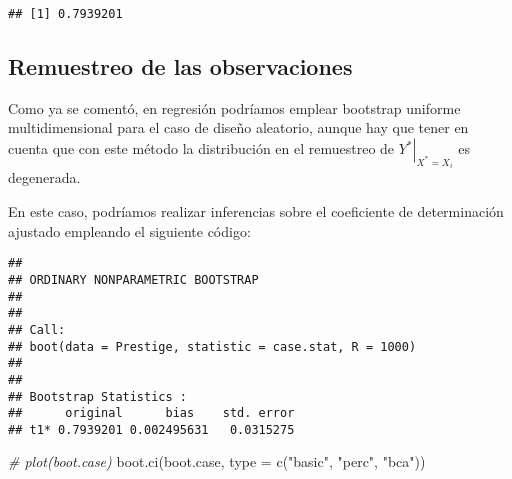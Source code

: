 \documentclass[
]{book}
\newenvironment{Shaded}{\begin{snugshade}}{\end{snugshade}}
\newcommand{\AttributeTok}[1]{\textcolor[rgb]{0.77,0.63,0.00}{#1}}
\newcommand{\CommentTok}[1]{\textcolor[rgb]{0.56,0.35,0.01}{\textit{#1}}}
\newcommand{\ControlFlowTok}[1]{\textcolor[rgb]{0.13,0.29,0.53}{\textbf{#1}}}
\newcommand{\DecValTok}[1]{\textcolor[rgb]{0.00,0.00,0.81}{#1}}
\newcommand{\FunctionTok}[1]{\textcolor[rgb]{0.00,0.00,0.00}{#1}}
\newcommand{\NormalTok}[1]{#1}
\newcommand{\OtherTok}[1]{\textcolor[rgb]{0.56,0.35,0.01}{#1}}
\newcommand{\SpecialCharTok}[1]{\textcolor[rgb]{0.00,0.00,0.00}{#1}}
\newcommand{\StringTok}[1]{\textcolor[rgb]{0.31,0.60,0.02}{#1}}
\theoremstyle{break}
\theoremstyle{definition}
\theoremstyle{definition}
\theoremstyle{definition}
\theoremstyle{definition}
\theoremstyle{remark}
\begin{document}
\begin{verbatim}
## [1] 0.7939201
\end{verbatim}

\hypertarget{boot-unif-reg}{%
\subsection{Remuestreo de las observaciones}\label{boot-unif-reg}}

Como ya se comentó, en regresión podríamos emplear bootstrap uniforme multidimensional para el caso de diseño aleatorio, aunque hay que tener en cuenta que con este método la distribución en el remuestreo de \(\left. Y^{\ast}\right\vert _{X^{\ast}=X_i}\) es degenerada.

En este caso, podríamos realizar inferencias sobre el coeficiente de determinación ajustado empleando el siguiente código:

\begin{Shaded}
\end{Shaded}

\begin{verbatim}
## 
## ORDINARY NONPARAMETRIC BOOTSTRAP
## 
## 
## Call:
## boot(data = Prestige, statistic = case.stat, R = 1000)
## 
## 
## Bootstrap Statistics :
##      original      bias    std. error
## t1* 0.7939201 0.002495631   0.0315275
\end{verbatim}

\begin{Shaded}
\begin{Highlighting}[]
\CommentTok{\# plot(boot.case)}
\FunctionTok{boot.ci}\NormalTok{(boot.case, }\AttributeTok{type =} \FunctionTok{c}\NormalTok{(}\StringTok{"basic"}\NormalTok{, }\StringTok{"perc"}\NormalTok{, }\StringTok{"bca"}\NormalTok{))}
\end{Highlighting}
\end{Shaded}
\end{document}
